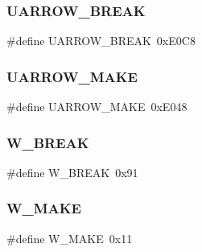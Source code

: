 \subsubsection{\texorpdfstring{U\+A\+R\+R\+O\+W\+\_\+\+B\+R\+E\+AK}{UARROW\_BREAK}}
{\footnotesize\ttfamily \#define U\+A\+R\+R\+O\+W\+\_\+\+B\+R\+E\+AK~0x\+E0\+C8}

\hypertarget{group__scancodes_ga4c8f4d4420f9ec7ef30de25264efa68a}{}\label{group__scancodes_ga4c8f4d4420f9ec7ef30de25264efa68a} 
\subsubsection{\texorpdfstring{U\+A\+R\+R\+O\+W\+\_\+\+M\+A\+KE}{UARROW\_MAKE}}
{\footnotesize\ttfamily \#define U\+A\+R\+R\+O\+W\+\_\+\+M\+A\+KE~0x\+E048}

\hypertarget{group__scancodes_ga32d11f9abffe8bb3df11feef5ca5213d}{}\label{group__scancodes_ga32d11f9abffe8bb3df11feef5ca5213d} 
\subsubsection{\texorpdfstring{W\+\_\+\+B\+R\+E\+AK}{W\_BREAK}}
{\footnotesize\ttfamily \#define W\+\_\+\+B\+R\+E\+AK~0x91}

\hypertarget{group__scancodes_gac822a3953d90207e64b58f480454a8d8}{}\label{group__scancodes_gac822a3953d90207e64b58f480454a8d8} 
\subsubsection{\texorpdfstring{W\+\_\+\+M\+A\+KE}{W\_MAKE}}
{\footnotesize\ttfamily \#define W\+\_\+\+M\+A\+KE~0x11}

